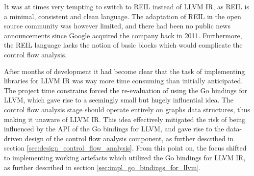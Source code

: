 
It was at times very tempting to switch to REIL instead of LLVM IR, as REIL is a minimal, consistent and clean language. The adaptation of REIL in the open source community was however limited, and there had been no public news announcements since Google acquired the company back in 2011. Furthermore, the REIL language lacks the notion of basic blocks which would complicate the control flow analysis.

After months of development it had become clear that the task of implementing libraries for LLVM IR was way more time consuming than initially anticipated. The project time constrains forced the re-evaluation of using the Go bindings for LLVM, which gave rise to a seemingly small but hugely influential idea. The control flow analysis stage should operate entirely on graphs data structures, thus making it unaware of LLVM IR. This idea effectively mitigated the risk of being influenced by the API of the Go bindings for LLVM, and gave rise to the data-driven design of the control flow analysis component, as further described in section \ref{sec:design_control_flow_analysis}. From this point on, the focus shifted to implementing working artefacts which utilized the Go bindings for LLVM IR, as further described in section \ref{sec:impl_go_bindings_for_llvm}.
